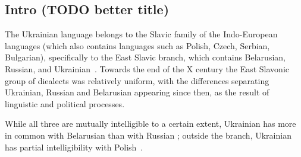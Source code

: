 
\subsection{Intro (TODO better title)}\label{intro-todo-better-title}

The Ukrainian language belongs to the Slavic family of the Indo-European
languages (which also contains languages such as Polish, Czech, Serbian,
Bulgarian), specifically to the East Slavic branch, which contains
Belarusian, Russian, and Ukrainian~\cite{grenoble2010contact}. Towards
the end of the X century the East Slavonic group of diealects was
relatively uniform, with the differences separating Ukrainian, Russian
and Belarusian appearing since then, as the result of linguistic and
political processes. \cite{press2015ukrainian}

While all three are mutually intelligible to a certain extent, Ukrainian
has more in common with Belarusian than with Russian
\cite{press2015ukrainian}; outside the branch, Ukrainian has partial
intelligibility with Polish~\cite{rehbein2014check}.

